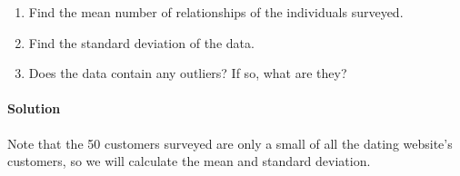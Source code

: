 \documentclass[letterpaper,10pt,english]{jupyterBook}
\begin{document}
\begin{enumerate}
%
\item {} 
\sphinxAtStartPar
Find the mean number of relationships of the individuals surveyed.

\item {} 
\sphinxAtStartPar
Find the standard deviation of the data.

\item {} 
\sphinxAtStartPar
Does the data contain any outliers? If so, what are they?

\end{enumerate}


\paragraph{Solution}
\label{\detokenize{Ch2 Descriptive Statistics/2.3 Measures of Dispersion:id5}}
\sphinxAtStartPar
Note that the 50 customers surveyed are only a small  of all the dating website’s customers, so we will calculate the  mean and  standard deviation.
\end{document}
